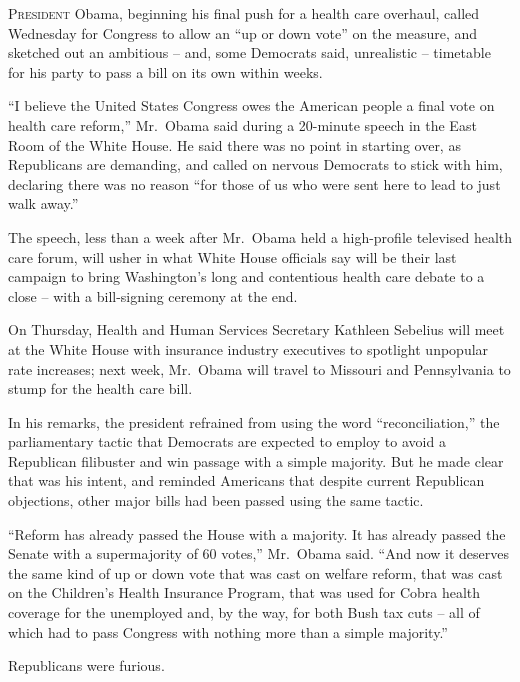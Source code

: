 ﻿\documentclass[12pt]{article}
\begin{document}
\lettrine{P}{resident} Obama, beginning his final push for a health care
overhaul, called Wednesday for Congress to allow an ``up or down vote'' on the measure, and sketched
out an ambitious -- and, some Democrats said, unrealistic -- timetable for his party to pass a bill
on its own within weeks.


``I believe the United States Congress owes the American people a final vote on health care
reform,'' Mr.~Obama said during a 20-minute speech in the East Room of the White House. He said
there was no point in starting over, as Republicans are demanding, and called on nervous Democrats
to stick with him, declaring there was no reason ``for those of us who were sent here to lead to
just walk away.''

The speech, less than a week after Mr.~Obama held a high-profile televised health care forum, will
usher in what White House officials say will be their last campaign to bring Washington's long and
contentious health care debate to a close -- with a bill-signing ceremony at the end.

On Thursday, Health and Human Services Secretary Kathleen Sebelius will meet at the White House with
insurance industry executives to spotlight unpopular rate increases; next week, Mr.~Obama will
travel to Missouri and Pennsylvania to stump for the health care bill.

In his remarks, the president refrained from using the word ``reconciliation,'' the parliamentary
tactic that Democrats are expected to employ to avoid a Republican filibuster and win passage with a
simple majority. But he made clear that was his intent, and reminded Americans that despite current
Republican objections, other major bills had been passed using the same tactic.

``Reform has already passed the House with a majority. It has already passed the Senate with a
supermajority of 60 votes,'' Mr.~Obama said. ``And now it deserves the same kind of up or down vote
that was cast on welfare reform, that was cast on the Children's Health Insurance Program, that was
used for Cobra health coverage for the unemployed and, by the way, for both Bush tax cuts -- all of
which had to pass Congress with nothing more than a simple majority.''

Republicans were furious.
\end{document}
